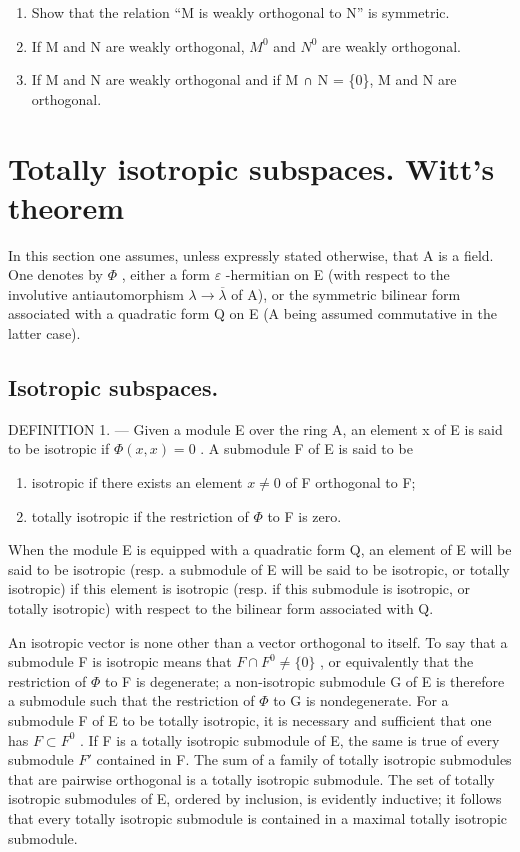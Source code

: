 \begin{enumerate}
\def\labelenumi{\alph{enumi})}
\item
  Show that the relation “M is weakly orthogonal to N” is symmetric.
\item
  If M and N are weakly orthogonal, \(M^{0}\) and \(N^{0}\) are weakly orthogonal.
\item
  If M and N are weakly orthogonal and if M ∩ N = \{0\}, M and N are orthogonal.
\end{enumerate}

\section{Totally isotropic subspaces. Witt's theorem}

In this section one assumes, unless expressly stated otherwise, that A is a field. One denotes by \(\Phi\) , either a form \(\varepsilon\) -hermitian on E (with respect to the involutive antiautomorphism \(\lambda \to \overline{\lambda}\) of A), or the symmetric bilinear form associated with a quadratic form Q on E (A being assumed commutative in the latter case).

\subsection{Isotropic subspaces.}

DEFINITION 1. --- Given a module E over the ring A, an element x of E is said to be isotropic if \(\Phi(x, x) = 0\) . A submodule F of E is said to be

\begin{enumerate}
\def\labelenumi{\arabic{enumi})}
\item
  isotropic if there exists an element \(x \neq 0\) of F orthogonal to F;
\item
  totally isotropic if the restriction of \(\Phi\) to F is zero.
\end{enumerate}

When the module E is equipped with a quadratic form Q, an element of E will be said to be isotropic (resp. a submodule of E will be said to be isotropic, or totally isotropic) if this element is isotropic (resp. if this submodule is isotropic, or totally isotropic) with respect to the bilinear form associated with Q.

An isotropic vector is none other than a vector orthogonal to itself. To say that a submodule F is isotropic means that \(F \cap F^{0} \neq \{0\}\) , or equivalently that the restriction of \(\Phi\) to F is degenerate; a non-isotropic submodule G of E is therefore a submodule such that the restriction of \(\Phi\) to G is nondegenerate. For a submodule F of E to be totally isotropic, it is necessary and sufficient that one has \(F \subset F^{0}\) . If F is a totally isotropic submodule of E, the same is true of every submodule \(F'\) contained in F. The sum of a family of totally isotropic submodules that are pairwise orthogonal is a totally isotropic submodule. The set of totally isotropic submodules of E, ordered by inclusion, is evidently inductive; it follows that every totally isotropic submodule is contained in a maximal totally isotropic submodule.


